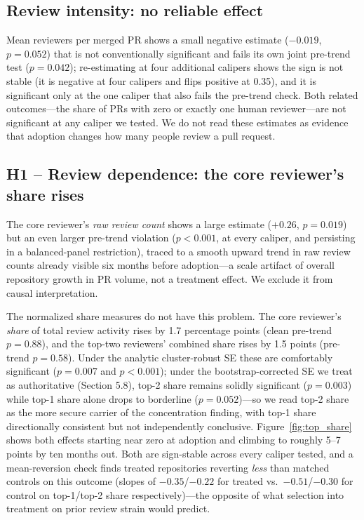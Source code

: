 \documentclass[12pt]{article}
\begin{document}
\subsection{Review intensity: no reliable effect}

Mean reviewers per merged PR shows a small negative estimate ($-0.019$,
$p=0.052$) that is not conventionally significant and fails its own joint
pre-trend test ($p=0.042$); re-estimating at four additional calipers
shows the sign is not stable (it is negative at four calipers and flips
positive at 0.35), and it is significant only at the one caliper that also
fails the pre-trend check. Both related outcomes---the share of PRs with
zero or exactly one human reviewer---are not significant at any caliper
we tested. We do not read these estimates as evidence that adoption
changes how many people review a pull request.

\subsection{H1 -- Review dependence: the core reviewer's share rises}

The core reviewer's \emph{raw review count} shows a large estimate
($+0.26$, $p=0.019$) but an even larger pre-trend violation
($p<0.001$, at every caliper, and persisting in a balanced-panel
restriction), traced to a smooth upward trend in raw review counts already
visible six months before adoption---a scale artifact of overall
repository growth in PR volume, not a treatment effect. We exclude it from
causal interpretation.

The normalized share measures do not have this problem. The core
reviewer's \emph{share} of total review activity rises by 1.7 percentage
points (clean pre-trend $p=0.88$), and the top-two reviewers' combined
share rises by 1.5 points (pre-trend $p=0.58$). Under the analytic
cluster-robust SE these are comfortably significant ($p=0.007$ and
$p<0.001$); under the bootstrap-corrected SE we treat as authoritative
(Section 5.8), top-2 share remains solidly significant ($p=0.003$) while
top-1 share alone drops to borderline ($p=0.052$)---so we read top-2
share as the more secure carrier of the concentration finding, with
top-1 share directionally consistent but not independently conclusive.
Figure~\ref{fig:top_share} shows both effects starting near zero at
adoption and climbing to roughly 5--7 points by ten months out. Both are
sign-stable across every caliper tested, and a mean-reversion check finds
treated repositories reverting \emph{less} than matched controls on this
outcome (slopes of $-0.35$/$-0.22$ for treated vs.\ $-0.51$/$-0.30$ for
control on top-1/top-2 share respectively)---the opposite of what
selection into treatment on prior review strain would predict.
\end{document}
